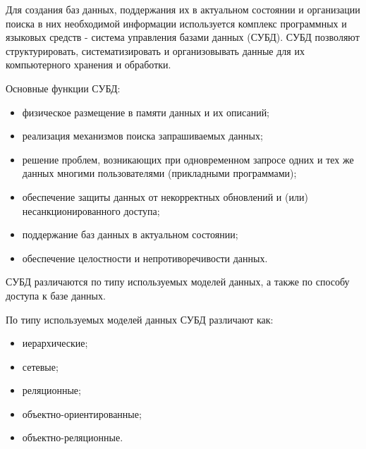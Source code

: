 \documentclass[12pt,a4paper,oneside]{article} %
\begin{document}
Для создания баз данных, поддержания их в актуальном состоянии \linebreak
и организации поиска в них необходимой информации используется \linebreak
комплекс программных и языковых средств - система управления \linebreak
базами данных (СУБД). СУБД позволяют структурировать, \linebreak
систематизировать и организовывать данные для их компьютерного \linebreak
хранения и обработки.

Основные функции СУБД:

\begin{itemize}
\item физическое размещение в памяти данных и их описаний;
\item реализация механизмов поиска запрашиваемых данных;
\item решение проблем, возникающих при одновременном запросе одних и тех \linebreak
же данных многими пользователями (прикладными программами);
\item обеспечение защиты данных от некорректных обновлений и (или) \linebreak
    несанкционированного доступа;
\item поддержание баз данных в актуальном состоянии;
\item обеспечение целостности и непротиворечивости данных.
\end{itemize}

СУБД различаются по типу используемых моделей данных, а также по способу доступа к базе данных.

По типу используемых моделей данных СУБД различают как:
\begin{itemize}
\item иерархические;
\item сетевые;
\item реляционные;
\item объектно-ориентированные;
\item объектно-реляционные.
\end{itemize}
\end{document}
